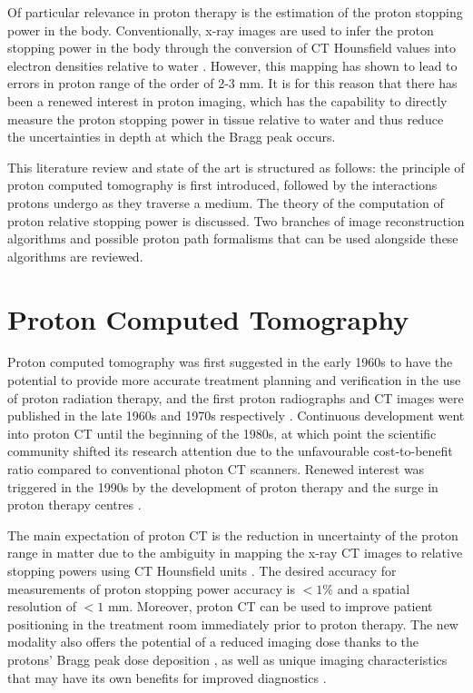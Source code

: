 \documentclass[11pt,a4paper]{article}
\begin{document}
Of particular relevance in proton therapy is the estimation of the proton stopping power in the body. Conventionally, x-ray images are used to infer the proton stopping power in the body through the conversion of CT Hounsfield values into electron densities relative to water \cite{chen1979treatment, mustafa1983relation, schneider1996calibration}. However, this mapping has shown to lead to errors in proton range of the order of 2-3 mm. It is for this reason that there has been a renewed interest in proton imaging, which has the capability to directly measure the proton stopping power in tissue relative to water and thus reduce the uncertainties in depth at which the Bragg peak occurs.
	
This literature review and state of the art is structured as follows: the principle of proton computed tomography is first introduced, followed by the interactions protons undergo as they traverse a medium. The theory of the computation of proton relative stopping power is discussed. Two branches of image reconstruction algorithms and possible proton path formalisms that can be used alongside these algorithms are reviewed. 

\section{Proton Computed Tomography}
\label{sec:pCT}
Proton computed tomography was first suggested in the early 1960s to have the potential to provide more accurate treatment planning and verification in the use of proton radiation therapy, and the first proton radiographs and CT images were published in the late 1960s and 1970s respectively \cite{cormack1963representation,cormack1976quantitative,hanson1978application}. Continuous development went into proton CT until the beginning of the 1980s, at which point the scientific community shifted its research attention due to the unfavourable cost-to-benefit ratio compared to conventional photon CT scanners. Renewed interest was triggered in the 1990s by the development of proton therapy and the surge in proton therapy centres \cite{goethals2013proton}.

The main expectation of proton CT is the reduction in uncertainty of the proton range in matter due to the ambiguity in mapping the x-ray CT images to relative stopping powers using CT Hounsfield units \cite{schaffner1998precision}. The desired accuracy for measurements of proton stopping power accuracy is $< 1\%$ and a spatial resolution of $< 1$ mm. Moreover, proton CT can be used to improve patient positioning in the treatment room immediately prior to proton therapy. The new modality also offers the potential of a reduced imaging dose thanks to the protons' Bragg peak dose deposition \cite{wang2011bragg}, as well as unique imaging characteristics that may have its own benefits for improved diagnostics \cite{depauw2011sensitivity}.
\end{document}
